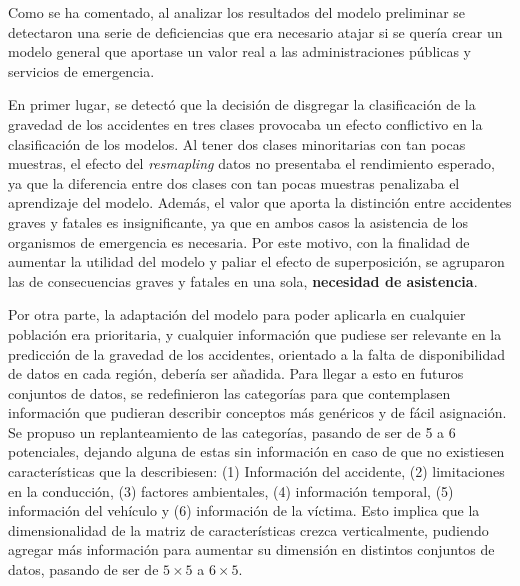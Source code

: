 

Como se ha comentado, al analizar los resultados del modelo preliminar se detectaron una serie de deficiencias que era necesario atajar si se quería crear un modelo general que aportase un valor real a las administraciones públicas y servicios de emergencia.

En primer lugar, se detectó que la decisión de disgregar la clasificación de la gravedad de los accidentes en tres clases provocaba un efecto conflictivo en la clasificación de los modelos. Al tener dos clases minoritarias con tan pocas muestras, el efecto del \textit{resmapling} datos no presentaba el rendimiento esperado, ya que la diferencia entre dos clases con tan pocas muestras penalizaba el aprendizaje del modelo. Además, el valor que aporta la distinción entre accidentes graves y fatales es insignificante, ya que en ambos casos la asistencia de los organismos de emergencia es necesaria. Por este motivo, con la finalidad de aumentar la utilidad del modelo y paliar el efecto de superposición, se agruparon las de consecuencias graves y fatales en una sola, \textbf{necesidad de asistencia}.




Por otra parte, la adaptación del modelo para poder aplicarla en cualquier población era prioritaria, y cualquier información que pudiese ser relevante en la predicción de la gravedad de los accidentes, orientado a la falta de disponibilidad de datos en cada región, debería ser añadida. Para llegar a esto en futuros conjuntos de datos, se redefinieron las categorías para que contemplasen información que pudieran describir conceptos más genéricos y de fácil asignación. Se propuso un replanteamiento de las categorías, pasando de ser de 5 a 6 potenciales, dejando alguna de estas sin información en caso de que no existiesen características que la describiesen: (1) Información del accidente, (2) limitaciones en la conducción, (3) factores ambientales, (4) información temporal, (5) información del vehículo y (6) información de la víctima. Esto implica que la dimensionalidad de la matriz de características crezca verticalmente, pudiendo agregar más información para aumentar su dimensión en distintos conjuntos de datos, pasando de ser de $5 \times 5$ a $6 \times 5$.

